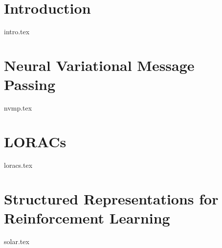 \chapter{Introduction}
\label{chap:bsrl-intro}
{intro.tex}

\chapter{Neural Variational Message Passing}
\label{chap:nvmp}
{nvmp.tex}

\chapter{LORACs}
\label{chap:loracs}
{loracs.tex}

\chapter{Structured Representations for Reinforcement Learning}
\label{chap:solar}
{solar.tex}
